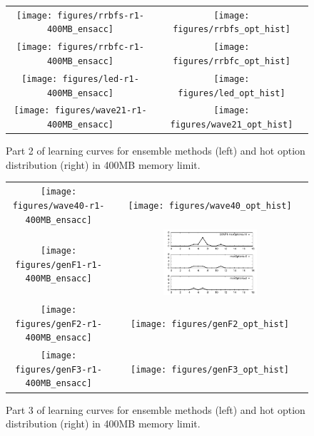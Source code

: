 \begin{figure}
\centering
\begin{tabular}{c@{}c}
\texttt{[image: figures/rrbfs-r1-400MB\_ensacc]} &
\texttt{[image: figures/rrbfs\_opt\_hist]} \\
\texttt{[image: figures/rrbfc-r1-400MB\_ensacc]} &
\texttt{[image: figures/rrbfc\_opt\_hist]} \\
\texttt{[image: figures/led-r1-400MB\_ensacc]} &
\texttt{[image: figures/led\_opt\_hist]} \\
\texttt{[image: figures/wave21-r1-400MB\_ensacc]} &
\texttt{[image: figures/wave21\_opt\_hist]} \\
\end{tabular}
\caption{Part 2 of learning curves for ensemble methods (left) and {\sc hot} option distribution (right) in 400MB memory limit.}
\label{fig:400MB_ens2}
\end{figure}

\begin{figure}
\centering
\begin{tabular}{c@{}c}
\texttt{[image: figures/wave40-r1-400MB\_ensacc]} &
\texttt{[image: figures/wave40\_opt\_hist]} \\
\texttt{[image: figures/genF1-r1-400MB\_ensacc]} &
\includegraphics[width=0.5\textwidth]{figures/genF1_opt_hist} \\
\texttt{[image: figures/genF2-r1-400MB\_ensacc]} &
\texttt{[image: figures/genF2\_opt\_hist]} \\
\texttt{[image: figures/genF3-r1-400MB\_ensacc]} &
\texttt{[image: figures/genF3\_opt\_hist]} \\
\end{tabular}
\caption{Part 3 of learning curves for ensemble methods (left) and {\sc hot} option distribution (right) in 400MB memory limit.}
\label{fig:400MB_ens3}
\end{figure}

